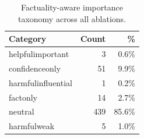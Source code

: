 \begin{table}[h]
\centering\small
\begin{tabular}{lrr}
\toprule
Category & Count & \% \\
\midrule
  helpful\-important & 3 & 0.6\% \\
  confidence\-only & 51 & 9.9\% \\
  harmful\-influential & 1 & 0.2\% \\
  fact\-only & 14 & 2.7\% \\
  neutral & 439 & 85.6\% \\
  harmful\-weak & 5 & 1.0\% \\
\bottomrule
\end{tabular}
\caption{Factuality-aware importance taxonomy across all ablations.}
\label{tab:e2_taxonomy_overall}
\end{table}
